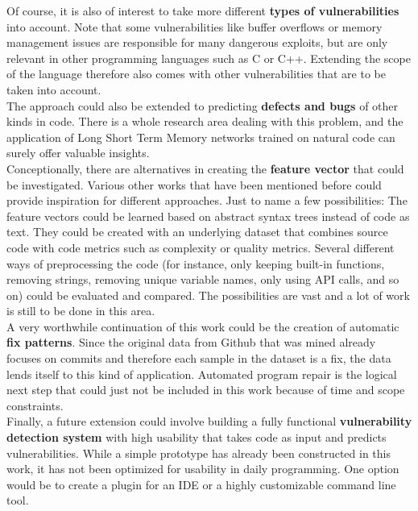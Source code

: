 \documentclass[
a4paper,
pagesize,
pdftex,
12pt,
twoside, %
BCOR=5mm, %
ngerman,
fleqn,
final,
]{scrartcl}
\begin{document}
	Of course, it is also of interest to take more different \textbf{types of vulnerabilities} into account. Note that some vulnerabilities like buffer overflows or memory management issues are responsible for many dangerous exploits, but are only relevant in other programming languages such as C or C++. Extending the scope of the language therefore also comes with other vulnerabilities that are to be taken into account.\\
	The approach could also be extended to predicting \textbf{defects and bugs} of other kinds in code. There is a whole research area dealing with this problem, and the application of Long Short Term Memory networks trained on natural code can surely offer valuable insights.\\
	Conceptionally, there are alternatives in creating the \textbf{feature vector} that could be investigated. Various other works that have been mentioned before could provide inspiration for different approaches. Just to name a few possibilities: The feature vectors could be learned based on abstract syntax trees instead of code as text. They could be created with an underlying dataset that combines source code with code metrics such as complexity or quality metrics. Several different ways of preprocessing the code (for instance, only keeping built-in functions, removing strings, removing unique variable names, only using API calls, and so on) could be evaluated and compared. The possibilities are vast and a lot of work is still to be done in this area.\\
	A very worthwhile continuation of this work could be the creation of automatic \textbf{fix patterns}. Since the original data from Github that was mined already focuses on commits and therefore each sample in the dataset is a fix, the data lends itself to this kind of application. Automated program repair is the logical next step that could just not be included in this work because of time and scope constraints.\\
	Finally, a future extension could involve building a fully functional \textbf{vulnerability detection system} with high usability that takes code as input and predicts vulnerabilities. While a simple prototype has already been constructed in this work, it has not been optimized for usability in daily programming. One option would be to create a plugin for an IDE or a highly customizable command line tool.
	
	
	
	
	
	
	
\end{document}
